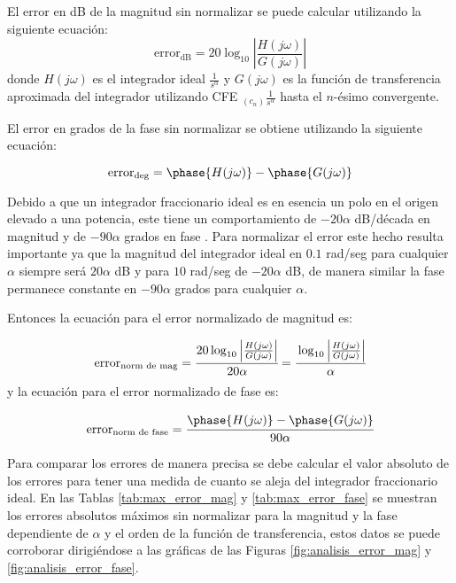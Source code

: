 	El error en dB de la magnitud sin normalizar se puede calcular utilizando la siguiente ecuación:
	\begin{equation}
		\mathrm{error}_{\mathrm{dB}} = 20\log_{10} \left| \frac{H(j\omega)}{G(j\omega)} \right|
		\label{ec:error_sin_norm}
	\end{equation}
	donde $H(j\omega)$ es el integrador ideal $\frac{1}{s^{\alpha}}$ y $G(j\omega)$ es la función de transferencia aproximada del integrador utilizando CFE $ _{(c_{n})} \frac{1}{s^{\alpha}}$ hasta el $n$-ésimo convergente. 
	
	El error en grados de la fase sin normalizar se obtiene utilizando la siguiente ecuación:
	
	\begin{equation}
		\mathrm{error}_{\mathrm{deg}} = \phase{H(j\omega)} - \phase{G(j\omega)}
	\end{equation}
	
	Debido a que un integrador fraccionario ideal es en esencia un polo en el origen elevado a una potencia, este tiene un comportamiento de $-20 \alpha$ dB/década en magnitud y de $-90\alpha$ grados en fase \cite{CharlesAlexander2016}. Para normalizar el error este hecho resulta importante ya que la magnitud del integrador ideal en $0.1$ rad/seg para cualquier $\alpha$ siempre será $20 \alpha$ dB y para $10$ rad/seg de $-20 \alpha$ dB, de manera similar la fase permanece constante en $-90\alpha$ grados para cualquier $\alpha$.
	
	Entonces la ecuación para el error normalizado de magnitud es:
	
	\begin{equation}
		\mathrm{error}_{\mathrm{norm\,\,de\,\,mag}} = \cfrac{ 20\log_{10} \left| \frac{H(j\omega)}{G(j\omega)} \right| }{20 \alpha} = \cfrac{ \log_{10} \left| \frac{H(j\omega)}{G(j\omega)} \right| }{ \alpha}
	\end{equation}
	y la ecuación para el error normalizado de fase es:
	
	\begin{equation}
		\mathrm{error}_{\mathrm{norm\,\,de\,\,fase}} = \cfrac{\phase{H(j\omega)} - \phase{G(j\omega)}}{90\alpha}
	\end{equation}
	
	Para comparar los errores de manera precisa se debe calcular el valor absoluto de los errores para tener una medida de cuanto se aleja del integrador fraccionario ideal. En las Tablas \ref{tab:max_error_mag} y \ref{tab:max_error_fase} se muestran los errores absolutos máximos sin normalizar para la magnitud y la fase dependiente de $\alpha$ y el orden de la función de transferencia, estos datos se puede corroborar dirigiéndose a las gráficas de las Figuras \ref{fig:analisis_error_mag} y \ref{fig:analisis_error_fase}.
	

